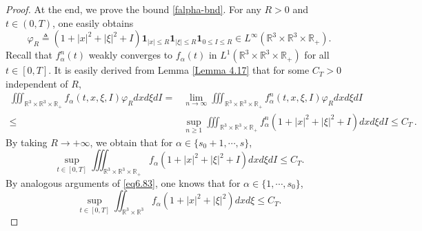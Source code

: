 \documentclass[reqno,11pt]{amsart}
\numberwithin{equation}{section}
\def\R{\mathbb{R}}
\begin{document}
\begin{proof}
At the end, we prove the bound \eqref{falpha-bnd}. For any $R>0$ and $ t \in (0,T) $, one easily obtains
	\begin{equation*}
		\varphi_R \triangleq (1+|x|^2 +|\xi|^2 +I) \mathbf{1}_{|x|\leq R } \mathbf{1}_{|\xi|\leq R} \mathbf{1}_{0\leq I \leq R} \in L^\infty (\R^3 \times \R^3 \times \R_+).
	\end{equation*}
Recall that $f^n_\alpha (t) $ weakly converges to $ f_\alpha (t)$ in $L^1 (\R^3 \times \R^3 \times \R_+)$ for all $t \in [0, T]$. It is easily derived from Lemma \ref{Lemma 4.17} that for some $C_T > 0$ independent of $R$,
	\begin{equation*}
		\begin{aligned}
			\iiint_{ \R^3 \times \R^3 \times \R_+} f_\alpha (t,x,\xi ,I) \varphi_R dxd\xi dI
			=& \lim \limits_{n\rightarrow \infty } \iiint_{ \R^3 \times \R^3 \times \R_+} f^n_\alpha (t,x,\xi ,I) \varphi_R dxd\xi dI \\
			\leq & \sup \limits_{n \geq 1} \iiint_{ \R^3 \times \R^3 \times \R_+} f^n_\alpha (1+|x|^2 +|\xi|^2 +I) dxd\xi dI \leq C_T \,.
		\end{aligned}
	\end{equation*}
By taking $R \to + \infty$, we obtain that for $\alpha \in \{ s_0 + 1, \cdots , s \}$,
	\begin{equation} \label{eq6.83}
		\sup_{t \in [0, T]} \iiint_{ \R^3 \times \R^3 \times \R_+} f_\alpha (1+|x|^2 +|\xi|^2 +I) dxd\xi dI  \leq C_T.
	\end{equation}
By analogous arguments of \eqref{eq6.83}, one knows that for $\alpha \in \{ 1, \cdots , s_0 \}$,
\begin{equation} \label{eq6.83+1}
		\sup_{t \in [0, T]} \iint_{ \R^3 \times \R^3 } f_\alpha (1+|x|^2 +|\xi|^2 ) dxd\xi \leq C_T.
	\end{equation}


\end{proof}
\end{document}

